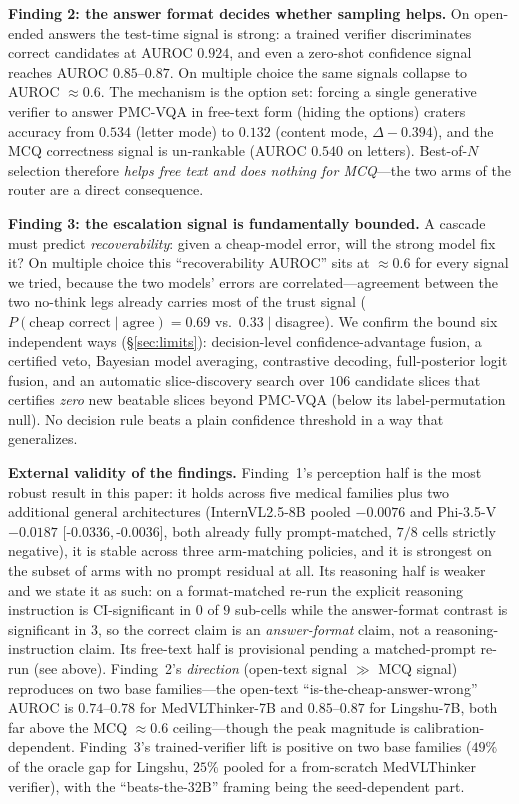 \documentclass[conference]{IEEEtran}
\newcommand{\ci}[2]{{\footnotesize[#1,\,#2]}}
\begin{document}
\textbf{Finding 2: the answer format decides whether sampling helps.} On open-ended answers the test-time signal is strong: a trained verifier discriminates correct candidates at AUROC $0.924$, and even a zero-shot confidence signal reaches AUROC $0.85$--$0.87$. On multiple choice the same signals collapse to AUROC ${\approx}0.6$. The mechanism is the option set: forcing a single generative verifier to answer PMC-VQA in free-text form (hiding the options) craters accuracy from $0.534$ (letter mode) to $0.132$ (content mode, $\Delta{-}0.394$), and the MCQ correctness signal is un-rankable (AUROC $0.540$ on letters). Best-of-$N$ selection therefore \emph{helps free text and does nothing for MCQ}---the two arms of the router are a direct consequence.

\textbf{Finding 3: the escalation signal is fundamentally bounded.} A cascade must predict \emph{recoverability}: given a cheap-model error, will the strong model fix it? On multiple choice this ``recoverability AUROC'' sits at ${\approx}0.6$ for every signal we tried, because the two models' errors are correlated---agreement between the two no-think legs already carries most of the trust signal ($P(\text{cheap correct}\mid\text{agree}){=}0.69$ vs.\ $0.33\mid$disagree). We confirm the bound six independent ways (\S\ref{sec:limits}): decision-level confidence-advantage fusion, a certified veto, Bayesian model averaging, contrastive decoding, full-posterior logit fusion, and an automatic slice-discovery search over $106$ candidate slices that certifies \emph{zero} new beatable slices beyond PMC-VQA (below its label-permutation null). No decision rule beats a plain confidence threshold in a way that generalizes.

\textbf{External validity of the findings.} Finding~1's perception half is the most robust result in this paper: it holds across five medical families plus two additional general architectures (InternVL2.5-8B pooled $-0.0076$ and Phi-3.5-V $-0.0187$ \ci{-0.0336}{-0.0036}, both already fully prompt-matched, $7/8$ cells strictly negative), it is stable across three arm-matching policies, and it is strongest on the subset of arms with no prompt residual at all. Its reasoning half is weaker and we state it as such: on a format-matched re-run the explicit reasoning instruction is CI-significant in $0$ of $9$ sub-cells while the answer-format contrast is significant in $3$, so the correct claim is an \emph{answer-format} claim, not a reasoning-instruction claim. Its free-text half is provisional pending a matched-prompt re-run (see above). Finding~2's \emph{direction} (open-text signal $\gg$ MCQ signal) reproduces on two base families---the open-text ``is-the-cheap-answer-wrong'' AUROC is $0.74$--$0.78$ for MedVLThinker-7B and $0.85$--$0.87$ for Lingshu-7B, both far above the MCQ ${\approx}0.6$ ceiling---though the peak magnitude is calibration-dependent. Finding~3's trained-verifier lift is positive on two base families ($49\%$ of the oracle gap for Lingshu, $25\%$ pooled for a from-scratch MedVLThinker verifier), with the ``beats-the-32B'' framing being the seed-dependent part.
\end{document}
